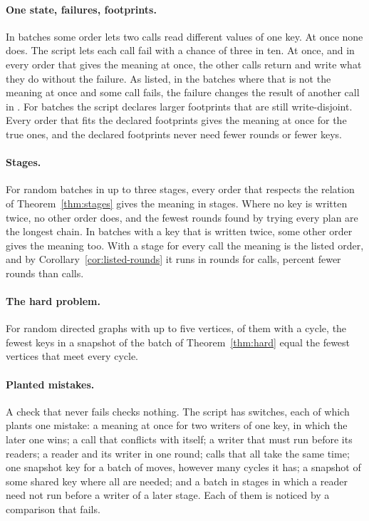 \documentclass[acmsmall,nonacm,screen]{acmart}
\newcommand{\claim}[2]{#2}
\begin{document}
\paragraph{One state, failures, footprints.} \claim{torn}{In \exTorn{} batches some order
lets two calls read different values of one key. At once none does.} \claim{failures}{The
script lets each call fail with a chance of three in ten. At once, and in every order that
gives the meaning at once, the other calls return and write what they do without the
failure. As listed, in the \exListedFailed{} batches where that is not the meaning at once
and some call fails, the failure changes the result of another call in \exSpread{}.}
\claim{footprints}{For \exWider{} batches the script declares larger footprints that are
still write-disjoint. Every order that fits the declared footprints gives the meaning at
once for the true ones, and the declared footprints never need fewer rounds or fewer keys.}

\paragraph{Stages.} \claim{stages}{For \exStaged{} random batches in up to three stages, every
order that respects the relation of Theorem~\ref{thm:stages} gives the meaning in stages.
Where no key is written twice, no other order does, and the fewest rounds found by trying
every plan are the longest chain. In \exMoreOrders{} batches with a key that is written
twice, some other order gives the meaning too. With a stage for every call the meaning is
the listed order, and by Corollary~\ref{cor:listed-rounds} it runs in \exListedRounds{}
rounds for \exListedCalls{} calls, \exListedSaved{} percent fewer rounds than calls.}

\paragraph{The hard problem.} \claim{graphs}{For \exGraphs{} random directed graphs with up
to five vertices, \exWithCycle{} of them with a cycle, the fewest keys in a snapshot of the
batch of Theorem~\ref{thm:hard} equal the fewest vertices that meet every cycle.}

\paragraph{Planted mistakes.} A check that never fails checks nothing. The script has
\exMutants{} switches, each of which plants one mistake: a meaning at once for two writers
of one key, in which the later one wins; a call that conflicts with itself; a writer that
must run before its readers; a reader and its writer in one round; calls that all take the same time; one snapshot key for a
batch of moves, however many cycles it has; a snapshot of some shared key where all are
needed; and a batch in stages in which a reader need not run before a writer of a later
stage. \claim{all-noticed}{Each of them is noticed by a comparison that fails.}
\end{document}
